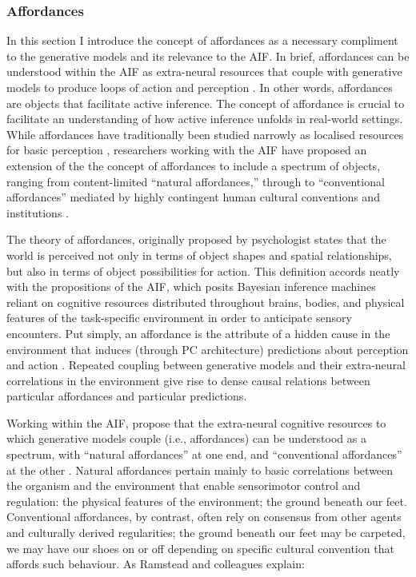 \begin{CJK}{UTF8}{gbsn}
\subsubsection{Affordances\label{sect:affordances}}
In this section I introduce the concept of affordances as a necessary compliment to the generative models and its relevance to the AIF.  In brief, affordances can be understood within the AIF as extra-neural resources that couple with generative models to produce loops of action and perception \citep{Ramstead2016,Clark2015}.  In other words, affordances are objects that facilitate active inference.  The concept of affordance is crucial to facilitate an understanding of how active inference unfolds in real-world settings. While affordances have traditionally been studied narrowly as localised resources for basic perception \citep[e.g.][]{Fajen2011}, researchers working with the AIF have proposed an extension of the the concept of affordances to include a spectrum of objects, ranging from content-limited ``natural affordances,'' through to ``conventional affordances'' mediated by highly contingent human cultural conventions and institutions  \citep[see][]{Roepstorff2010,Ramstead2016}.

The theory of affordances, originally proposed by psychologist \textcite{Gibson1979} states that the world is perceived not only in terms of object shapes and spatial relationships, but also in terms of object possibilities for action.  This definition accords neatly with the propositions of the AIF, which posits Bayesian inference machines reliant on cognitive resources distributed throughout brains, bodies, and physical features of the task-specific environment in order to anticipate sensory encounters.  Put simply, an affordance is the attribute of a hidden cause in the environment that induces (through PC architecture) predictions about perception and action \citep[908]{Pezzulo2013}.  Repeated coupling between generative models and their extra-neural correlations in the environment give rise to dense causal relations between particular affordances and particular predictions.

Working within the AIF, \textcite[7]{Ramstead2016} propose that the extra-neural cognitive resources to which generative models couple (i.e., affordances) can be understood as a spectrum, with ``natural affordances'' at one end, and ``conventional affordances'' at the other \citep{Ramstead2016}.  Natural affordances pertain mainly to basic correlations between the organism and the environment that enable sensorimotor control and regulation: the physical features of the environment; the ground beneath our feet.  Conventional affordances, by contrast, often rely on consensus from other agents and culturally derived regularities; the ground beneath our feet may be carpeted, we may have our shoes on or off depending on specific cultural convention that affords such behaviour.  As Ramstead and colleagues explain:


\end{CJK}
